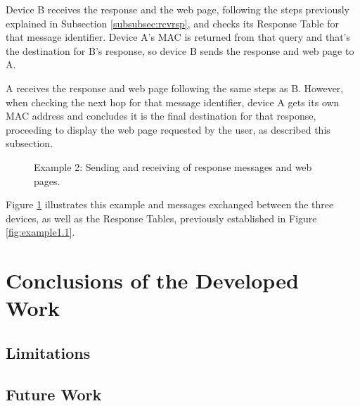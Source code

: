Device B receives the response and the web page, following the steps previously explained in Subsection \ref{subsubsec:rcvrsp}, and checks its Response Table for that message identifier. Device A's \gls{MAC} is returned from that query and that's the destination for B's response, so device B sends the response and web page to A.

A receives the response and web page following the same steps as B. However, when checking the next hop for that message identifier, device A gets its own \gls{MAC} address and concludes it is the final destination for that response, proceeding to display the web page requested by the user, as described this subsection.

\begin{figure}[ht]
   \noindent{}
	\caption{\label{fig:example1.2} Example 2: Sending and receiving of response messages and web pages.}
\end{figure}

Figure \ref{fig:example1.2} illustrates this example and messages exchanged between the three devices, as well as the Response Tables, previously established in Figure \ref{fig:example1.1}.

\section{Conclusions of the Developed Work}

\subsection{Limitations}


\subsection{Future Work}










